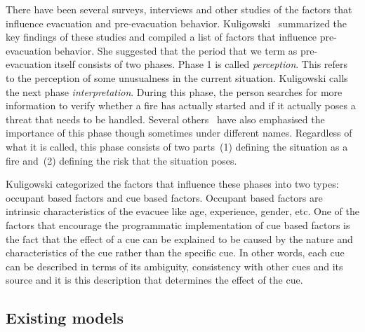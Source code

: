 There have been several surveys, interviews and other studies of the factors that influence evacuation and pre-evacuation behavior. Kuligowski~\cite{Kuligowski:2009un} summarized the key findings of these studies and compiled a list of factors that influence pre-evacuation behavior. She suggested that the period that we term as pre-evacuation itself consists of two phases. Phase 1 is called \emph{perception}. This refers to the perception of some unusualness in the current situation. Kuligowski calls the next phase \emph{interpretation}. During this phase, the person searches for more information to verify whether a fire has actually started and if it actually poses a threat that needs to be handled. Several others~\cite{Ozel:2001tn,Proulx:2007ul,Tong:1985wn} have also emphasised the importance of this phase though sometimes under different names. Regardless of what it is called, this phase consists of two parts~(1) defining the situation as a fire and~(2) defining the risk that the situation poses.


Kuligowski categorized the factors that influence these phases into two types: occupant based factors and cue based factors. Occupant based factors are intrinsic characteristics of the evacuee like age, experience, gender, etc. One of the factors that encourage the programmatic implementation of cue based factors is the fact that the effect of a cue can be explained to be caused by the nature and characteristics of the cue rather than the specific cue. In other words, each cue can be described in terms of its ambiguity, consistency with other cues and its source and it is this description that determines the effect of the cue.


\subsection{Existing models}
\label{ExistingModels}

